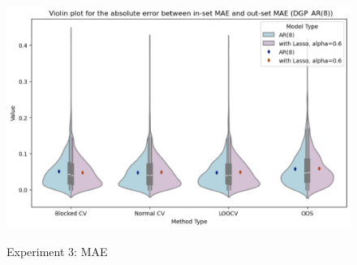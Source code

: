 \documentclass[12pt, oneside]{amsart}
\theoremstyle{definition}
\theoremstyle{remark}
\numberwithin{equation}{section}
\begin{document}
\begin{figure}[hbt!]
    \caption{Experiment 3: MAE}
    \centering
    \includegraphics[scale=0.41]{Report/Figures/ar8_violin_mae.jpg}
    \label{ar8_v2}
\end{figure}
\FloatBarrier
\end{document}
